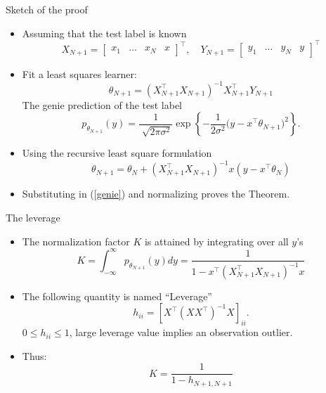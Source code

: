 \documentclass[aspectratio=169]{beamer}
\begin{document}
\begin{frame}{Sketch of the proof}
\begin{itemize}
\item Assuming that the test label is known
    \begin{equation*}
    X_{N+1} = \begin{bmatrix} x_1 & \dots & x_N & x \end{bmatrix}^\top, \;\;\ \ 
    Y_{N+1} = \begin{bmatrix} y_1 & \dots & y_N & y \end{bmatrix}^\top 
    \end{equation*}
\item Fit a least squares learner: 
    \begin{equation*}
    \theta_{N+1} = (X_{N+1}^\top X_{N+1})^{-1} X_{N+1}^\top Y_{N+1}
    \end{equation*}
    The genie prediction of the test label
    \begin{equation} \label{genie}
    p_{\theta_{N+1}}(y) =
    \frac{1}{\sqrt[]{2\pi\sigma^2}}\exp\left\{-\frac{1}{2\sigma^2}\big(y- x^\top \theta_{N+1} \big)^2\right\}.
    \end{equation}
\item Using the recursive least square formulation
    \begin{equation}
    \theta_{N+1} = \theta_{N} + \left(X_{N+1}^\top X_{N+1}\right)^{-1} x (y -  x^\top \theta_N)
    \end{equation}
\item Substituting in (\ref{genie}) and normalizing proves the Theorem.
\end{itemize}
\end{frame}


\begin{frame}{The leverage}
\begin{itemize}
\setlength\itemsep{1.0em}
\item The normalization factor $K$ is attained by integrating over all $y$'s
    \begin{equation}
        K 
        = \int_{-\infty}^{\infty} p_{\theta_{N+1}}(y) dy 
        = \frac{1}{1 - x^\top \left( X_{N+1}^\top X_{N+1} \right)^{-1} x }
    \end{equation}
\item The following quantity is named ``Leverage''
    \begin{equation*}
        h_{ii}=\left [ X^\top (XX^\top )^{-1}X \right]_{ii}.
    \end{equation*}
    $0\leq h_{ii} \leq 1$, large leverage value implies an observation outlier.
    \item Thus: \begin{equation} K= \frac{1}{1-h_{N+1,N+1}} \end{equation}
\end{itemize}
\end{frame}
\end{document}
